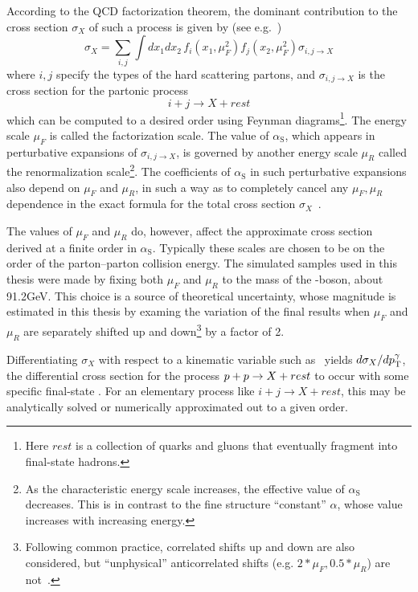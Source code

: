 According to the QCD factorization theorem, the dominant contribution to the cross section $\sigma_{X}$ of such a process is given by (see e.g.~\cite{ref:BargerPhillips})
\begin{equation}
\sigma_{X} = \sum_{i,j}\int \! dx_{1}dx_{2} \, f_{i}(x_{1}, \mu_{F}^{2})f_{j}(x_{2}, \mu_{F}^{2})\sigma_{i,j \to X}
\label{eq:qcd_factorization}
\end{equation}
where $i,j$ specify the types of the hard scattering partons, and $\sigma_{i,j \to X}$ is the cross section for the partonic process
\begin{equation}
i + j \to X + rest
\label{eq:parton_interaction}
\end{equation}
which can be computed to a desired order using Feynman diagrams\footnote{Here $rest$ is a collection of quarks and gluons
that eventually fragment into final-state hadrons.}. The energy scale $\mu_{F}$ is called the factorization scale.
The value of $\alpha_\mathrm{S}$, which appears in perturbative expansions of $\sigma_{i,j \to X}$, is governed by another energy scale $\mu_{R}$ called
the renormalization scale\footnote{As the characteristic
energy scale increases, the effective value of $\alpha_\mathrm{S}$ decreases. This is in contrast to the fine structure ``constant'' $\alpha$,
whose value increases with increasing energy.}.
The coefficients of $\alpha_\mathrm{S}$ in such perturbative expansions also depend on $\mu_{F}$ and $\mu_{R}$,
in such a way as to completely cancel any $\mu_{F}, \mu_{R}$ dependence in the exact formula for the total cross section $\sigma_{X}$~\cite{ref:0034-4885/70/1/R02}.

The values of $\mu_{F}$ and $\mu_{R}$ do, however, affect the approximate cross section derived at a finite order in $\alpha_\mathrm{S}$.
Typically these scales are chosen to be on the order of the parton--parton collision energy.
The simulated samples used in this thesis were made by fixing both $\mu_{F}$ and $\mu_{R}$ to the mass of the \PZ-boson, about 91.2\unit{GeV}.
This choice is a source of theoretical uncertainty, whose magnitude is estimated in this thesis by
examing the variation of the final results when $\mu_{F}$ and $\mu_{R}$ are separately shifted up and down\footnote{Following common practice, correlated shifts up and down
are also considered, but ``unphysical'' anticorrelated shifts (e.g. $2{*}\mu_{F}, 0.5{*}\mu_{R}$) are not~\cite{ref:scalepdf_bendavid}.} by a factor of 2.

Differentiating $\sigma_{X}$ with respect to a kinematic variable such as \pTgamma\ yields $d\sigma_{X}/dp^{\gamma}_\mathrm{T}$, the differential
cross section for the process $p + p \to X + rest$ to occur with some specific final-state \pTgamma.
For an elementary process like $i + j \to X + rest$, this may be analytically solved or numerically approximated out to a given order.

